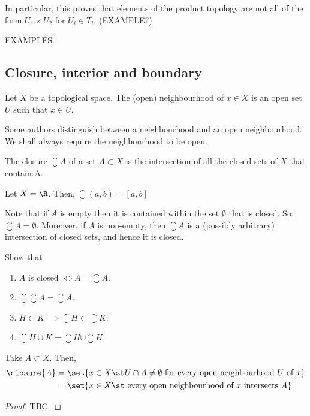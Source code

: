 In particular, this proves that elements of the product topology are not all of the form $U_1 \times U_2$ for $U_i \in T_i$. (EXAMPLE?)

EXAMPLES.

\subsection{Closure, interior and boundary}
\begin{ndfn}
  Let $X$ be a topological space. The (open) neighbourhood of $x \in X$ is an open set $U$ such that $x \in U$.
\end{ndfn}
Some authors distinguish between a neighbourhood and an open neighbourhood. We shall always require the neighbourhood to be open.

\begin{ndfn}
  The closure $\closure{A}$ of a set $A \subset X$ is the intersection of all the closed sets of $X$ that contain A.
\end{ndfn}

\begin{negg}
  Let $X=\R$. Then, $\closure{(a,b)} = [a,b]$
\end{negg}

Note that if $A$ is empty then it is contained within the set $\emptyset$ that is closed. So, $\closure{A} = \emptyset$. Moreover, if $A$ is non-empty, then $\closure{A}$ is a (possibly arbitrary) intersection of closed sets, and hence it is closed.

\begin{exercise}
Show that
\begin{enumerate}
\item $A$ is closed $\iff A = \closure{A}$.
\item $\closure{\closure{A}} = \closure{A}$.
\item $H \subset K \implies \closure{H} \subset \closure{K}$.
\item $\closure{H \cup K} = \closure{H} \cup \closure{K}$.
\end{enumerate}
\end{exercise}

\begin{nlemma}
  Take $A \subset X$. Then,
  \begin{align*}
    \closure{A} &= \set{x \in X \st U \cap A \neq \emptyset \text{ for every open neighbourhood } U \text{ of } x}\\
    &= \set{x \in X \st \text{ every open neighbourhood of } x \text{ intersects } A}\\
  \end{align*}
\end{nlemma}
\begin{proof}
  TBC.
\end{proof}

